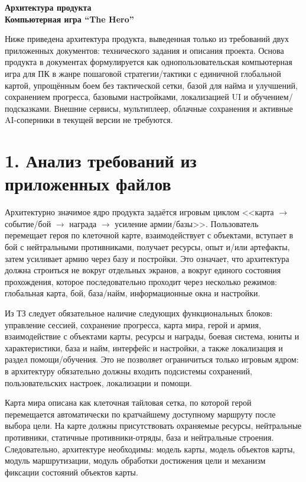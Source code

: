 \documentclass[12pt,a4paper]{article}
\begin{document}
\begin{center}
    \textbf{\Large Архитектура продукта}\\[0.5em]
    \textbf{\large Компьютерная игра ``The Hero''}
\end{center}

Ниже приведена архитектура продукта, выведенная только из требований двух приложенных документов: технического задания и описания проекта. Основа продукта в документах формулируется как однопользовательская компьютерная игра для ПК в жанре пошаговой стратегии/тактики с единичной глобальной картой, упрощённым боем без тактической сетки, базой для найма и улучшений, сохранением прогресса, базовыми настройками, локализацией UI и обучением/подсказками. Внешние сервисы, мультиплеер, облачные сохранения и активные AI-соперники в текущей версии не требуются.

\section*{1. Анализ требований из приложенных файлов}

Архитектурно значимое ядро продукта задаётся игровым циклом <<карта $\rightarrow$ событие/бой $\rightarrow$ награда $\rightarrow$ усиление армии/базы>>. Пользователь перемещает героя по клеточной карте, взаимодействует с объектами, вступает в бой с нейтральными противниками, получает ресурсы, опыт и/или артефакты, затем усиливает армию через базу и постройки. Это означает, что архитектура должна строиться не вокруг отдельных экранов, а вокруг единого состояния прохождения, которое последовательно проходит через несколько режимов: глобальная карта, бой, база/найм, информационные окна и настройки.

Из ТЗ следует обязательное наличие следующих функциональных блоков: управление сессией, сохранение прогресса, карта мира, герой и армия, взаимодействие с объектами карты, ресурсы и награды, боевая система, юниты и характеристики, база и найм, интерфейс и настройки, а также локализация и раздел помощи/обучения. Это не позволяет ограничиться только игровым ядром: в архитектуру обязательно должны входить подсистемы сохранений, пользовательских настроек, локализации и помощи.

Карта мира описана как клеточная тайловая сетка, по которой герой перемещается автоматически по кратчайшему доступному маршруту после выбора цели. На карте должны присутствовать охраняемые ресурсы, нейтральные противники, статичные противники-отряды, база и нейтральные строения. Следовательно, архитектуре необходимы: модель карты, модель объектов карты, модуль маршрутизации, модуль обработки достижения цели и механизм фиксации состояний объектов карты.
\end{document}
